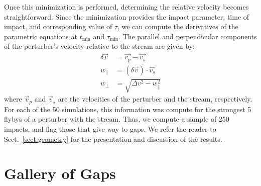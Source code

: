 \documentclass{aa}
\begin{document}
\begin{appendix}
      Once this minimization is performed, determining the relative velocity becomes straightforward. Since the minimization provides the impact parameter, time of impact, and corresponding value of $\tau$, we can compute the derivatives of the parametric equations at $t_{\text{min}}$ and $\tau_{\text{min}}$. The parallel and perpendicular components of the perturber's velocity relative to the stream are given by:
      \begin{equation}
        \begin{aligned}
          \delta \vec{v} &=\vec{v_p} - \vec{v_s} \\
          w_\parallel &= \left(\delta \vec{v}\right)\cdot \hat{v_s}\\  
          w_\perp &=  \sqrt{\Delta v ^2 - w_\parallel ^ 2}
          \end{aligned}
        \end{equation}
      where $\vec{v}_p$ and $\vec{v}_s$ are the velocities of the perturber and the stream, respectively. For each of the 50 simulations, this information was compute for the strongest 5 flybys of a perturber with the stream. Thus, we compute a sample of 250 impacts, and flag those that give way to gaps. We refer the reader to Sect.~\ref{sect:geometry} for the presentation and discussion of the results.




  \section{Gallery of Gaps} \label{sec:gallery_of_gaps}


\end{appendix}
\end{document}
